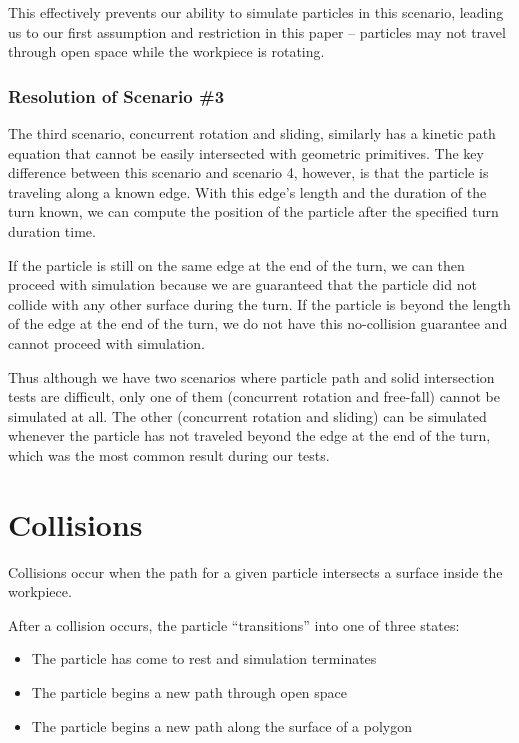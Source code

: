 This effectively prevents our ability to simulate particles in this scenario, leading us to our first assumption and restriction in this paper -- particles may not travel through open space while the workpiece is rotating.

		\subsubsection{Resolution of Scenario \#3}

The third scenario, concurrent rotation and sliding, similarly has a kinetic path equation that cannot be easily intersected with geometric primitives. The key difference between this scenario and scenario 4, however, is that the particle is traveling along a known edge. With this edge's length and the duration of the turn known, we can compute the position of the particle after the specified turn duration time.

If the particle is still on the same edge at the end of the turn, we can then proceed with simulation because we are guaranteed that the particle did not collide with any other surface during the turn. If the particle is beyond the length of the edge at the end of the turn, we do not have this no-collision guarantee and cannot proceed with simulation.

Thus although we have two scenarios where particle path and solid intersection tests are difficult, only one of them (concurrent rotation and free-fall) cannot be simulated at all. The other (concurrent rotation and sliding) can be simulated whenever the particle has not traveled beyond the edge at the end of the turn, which was the most common result during our tests.


	\section{Collisions}

Collisions occur when the path for a given particle intersects a surface inside the workpiece.


After a collision occurs, the particle ``transitions'' into one of three states:

\begin{itemize}
\item The particle has come to rest and simulation terminates
\item The particle begins a new path through open space
\item The particle begins a new path along the surface of a polygon
\end{itemize}

